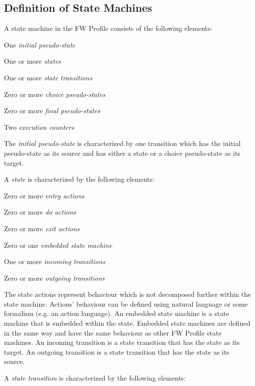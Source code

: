 \subsection{Definition of State Machines}
A state machine in the FW Profile consists of the following elements:

\begin{fw_itemize}
\item One \emph{initial pseudo-state}
\item One or more \emph{states}
\item One or more \emph{state transitions}
\item Zero or more \emph{choice pseudo-states}
\item Zero or more \emph{final pseudo-states}
\item Two \emph{execution counters}
\end{fw_itemize}

The \emph{initial pseudo-state} is characterized by one transition which has the initial pseudo-state as its source and has either a state or a choice pseudo-state as its target.

A \emph{state} is characterized by the following elements:

\begin{fw_itemize}
\item Zero or more \emph{entry actions}
\item Zero or more \emph{do actions}
\item Zero or more \emph{exit actions}
\item Zero or one \emph{embedded state machine}
\item One or more \emph{incoming transitions} 
\item Zero or more \emph{outgoing transitions}
\end{fw_itemize}

The state actions represent behaviour which is not decomposed further within the state machine. Actions' behaviour can be defined using natural 
language or some formalism (e.g. an action language). An embedded state machine is a state machine that is embedded within the state. Embedded state 
machines are defined in the same way and have the same behaviour as other FW Profile state machines. An incoming transition is a state transition that 
has the state as its target. An outgoing transition is a state transition that has the state as its source. 

A \emph{state transition} is characterized by the following elements:

